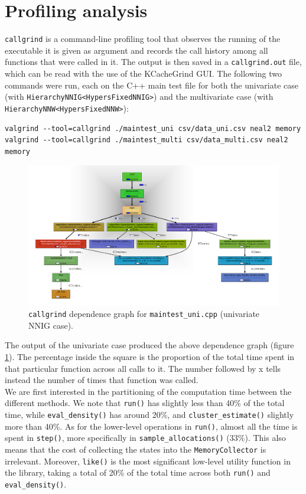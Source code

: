 \section{Profiling analysis}
\verb|callgrind| is a command-line profiling tool that observes the running of the executable it is given as argument and records the call history among all functions that were called in it.
The output is then saved in a \verb|callgrind.out| file, which can be read with the use of the KCacheGrind GUI.
The following two commands were run, each on the C++ main test file for both the univariate case (with \verb|HierarchyNNIG<HypersFixedNNIG>|) and the multivariate case (with \verb|HierarchyNNW<HypersFixedNNW>|):
\begin{verbatim}
valgrind --tool=callgrind ./maintest_uni csv/data_uni.csv neal2 memory
valgrind --tool=callgrind ./maintest_multi csv/data_multi.csv neal2 memory
\end{verbatim}
\begin{figure}[h]
	\hspace{-50pt}
	\includegraphics[scale=0.35]{etc/kcg_uni.png}
	\caption{\texttt{callgrind} dependence graph for \texttt{maintest\_uni.cpp} (univariate NNIG case).}
	\label{fig:profiling_nnig}
\end{figure}
The output of the univariate case produced the above dependence graph (figure \ref{fig:profiling_nnig}).
The percentage inside the square is the proportion of the total time spent in that particular function across all calls to it.
The number followed by x tells instead the number of times that function was called. \\
We are first interested in the partitioning of the computation time between the different methods.
We note that \verb|run()| has slightly less than 40\% of the total time, while \verb|eval_density()| has around 20\%, and \verb|cluster_estimate()| slightly more than 40\%.
As for the lower-level operations in \verb|run()|, almost all the time is spent in \verb|step()|, more specifically in \verb|sample_allocations()| (33\%).
This also means that the cost of collecting the states into the \verb|MemoryCollector| is irrelevant.
Moreover, \verb|like()| is the most significant low-level utility function in the library, taking a total of 20\% of the total time across both \verb|run()| and \verb|eval_density()|. \\

